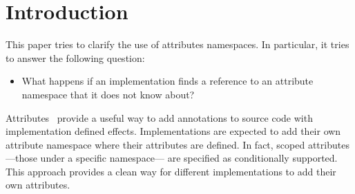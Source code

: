 \section{Introduction}

This paper tries to clarify the use of attributes namespaces. In particular,
it tries to answer the following question:

\begin{itemize}
\item What happens if an implementation finds a reference to an attribute namespace
      that it does not know about?

\end{itemize}

Attributes~\cite{n2761} provide a useful way to add annotations to source code
with implementation defined effects. Implementations are expected to add their
own attribute namespace where their attributes are defined. In fact, scoped
attributes ---those under a specific namespace--- are specified as
conditionally supported. This approach provides a clean way for different
implementations to add their own attributes.
